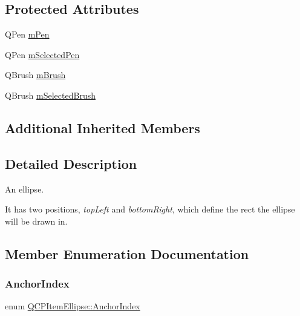 \subsection*{Protected Attributes}
\begin{DoxyCompactItemize}
\item 
Q\+Pen \mbox{\hyperlink{class_q_c_p_item_ellipse_a16ad9389acf028a7e4ac8fd7a550b2e4}{m\+Pen}}
\item 
Q\+Pen \mbox{\hyperlink{class_q_c_p_item_ellipse_a57b047abfce6f1a84ed46ca668c90e21}{m\+Selected\+Pen}}
\item 
Q\+Brush \mbox{\hyperlink{class_q_c_p_item_ellipse_a6fa59478cd3ad1b10e6c1f6cedc84bd6}{m\+Brush}}
\item 
Q\+Brush \mbox{\hyperlink{class_q_c_p_item_ellipse_a2e49d5547478aa36910ed8a2dcc8a5c0}{m\+Selected\+Brush}}
\end{DoxyCompactItemize}
\subsection*{Additional Inherited Members}


\subsection{Detailed Description}
An ellipse. 

 It has two positions, {\itshape top\+Left} and {\itshape bottom\+Right}, which define the rect the ellipse will be drawn in. 

\subsection{Member Enumeration Documentation}
\mbox{\label{class_q_c_p_item_ellipse_a415009889543169f35b70795f415e45e}} 
\subsubsection{\texorpdfstring{AnchorIndex}{AnchorIndex}}
{\footnotesize\ttfamily enum \mbox{\hyperlink{class_q_c_p_item_ellipse_a415009889543169f35b70795f415e45e}{Q\+C\+P\+Item\+Ellipse\+::\+Anchor\+Index}}\hspace{0.3cm}{\ttfamily [protected]}}

